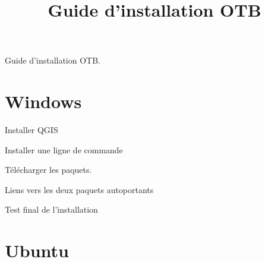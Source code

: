 \documentclass[12pt,a4paper]{article}
\title{Guide d'installation OTB}
\begin{document}
\maketitle

Guide d'installation OTB.
\section{Windows}

Installer QGIS

Installer une ligne de commande

Télécharger les paquets.

Liens vers les deux paquets autoportants

Test final de l'installation

\section{Ubuntu}
\end{document}
